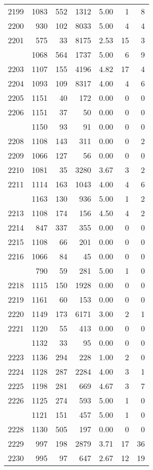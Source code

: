 \documentclass[
]{article}
\begin{document}
\begin{table}
\begin{tabular}[t]{lrrrrrr}
2199 & 1083 & 552 & 1312 & 5.00 & 1 & 8\\
2200 & 930 & 102 & 8033 & 5.00 & 4 & 4\\
2201 & 575 & 33 & 8175 & 2.53 & 15 & 3\\
\addlinespace
2202 & 1068 & 564 & 1737 & 5.00 & 6 & 9\\
2203 & 1107 & 155 & 4196 & 4.82 & 17 & 4\\
2204 & 1093 & 109 & 8317 & 4.00 & 4 & 6\\
2205 & 1151 & 40 & 172 & 0.00 & 0 & 0\\
2206 & 1151 & 37 & 50 & 0.00 & 0 & 0\\
\addlinespace
2207 & 1150 & 93 & 91 & 0.00 & 0 & 0\\
2208 & 1108 & 143 & 311 & 0.00 & 0 & 2\\
2209 & 1066 & 127 & 56 & 0.00 & 0 & 0\\
2210 & 1081 & 35 & 3280 & 3.67 & 3 & 2\\
2211 & 1114 & 163 & 1043 & 4.00 & 4 & 6\\
\addlinespace
2212 & 1163 & 130 & 936 & 5.00 & 1 & 2\\
2213 & 1108 & 174 & 156 & 4.50 & 4 & 2\\
2214 & 847 & 337 & 355 & 0.00 & 0 & 0\\
2215 & 1108 & 66 & 201 & 0.00 & 0 & 0\\
2216 & 1066 & 84 & 45 & 0.00 & 0 & 0\\
\addlinespace
2217 & 790 & 59 & 281 & 5.00 & 1 & 0\\
2218 & 1115 & 150 & 1928 & 0.00 & 0 & 0\\
2219 & 1161 & 60 & 153 & 0.00 & 0 & 0\\
2220 & 1149 & 173 & 6171 & 3.00 & 2 & 1\\
2221 & 1120 & 55 & 413 & 0.00 & 0 & 0\\
\addlinespace
2222 & 1132 & 33 & 95 & 0.00 & 0 & 0\\
2223 & 1136 & 294 & 228 & 1.00 & 2 & 0\\
2224 & 1128 & 287 & 2284 & 4.00 & 3 & 1\\
2225 & 1198 & 281 & 669 & 4.67 & 3 & 7\\
2226 & 1125 & 274 & 593 & 5.00 & 1 & 0\\
\addlinespace
2227 & 1121 & 151 & 457 & 5.00 & 1 & 0\\
2228 & 1130 & 505 & 197 & 0.00 & 0 & 0\\
2229 & 997 & 198 & 2879 & 3.71 & 17 & 36\\
2230 & 995 & 97 & 647 & 2.67 & 12 & 19\\

\end{tabular}
\end{table}
\end{document}
